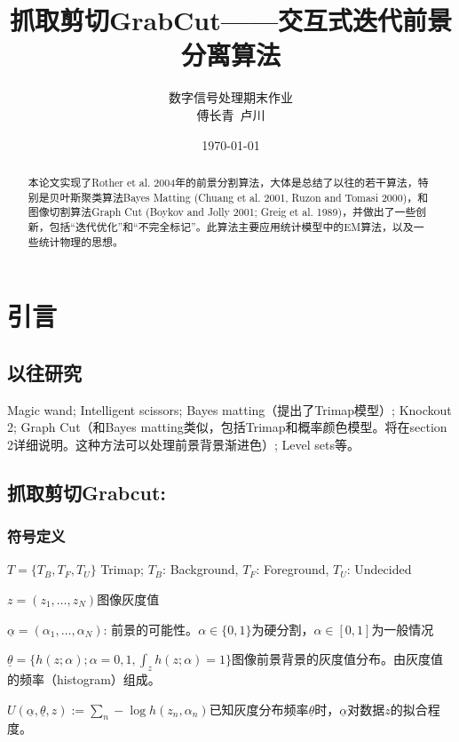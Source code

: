 \documentclass[a4paper, 11pt, nofonts, nocap, fancyhdr, hyperref, UTF8]{ctexart}
\begin{document}
\title{抓取剪切GrabCut——交互式迭代前景分离算法}

\author{\small{数字信号处理期末作业}\\
傅长青\ 卢川\\
}
\date{\today}
\maketitle

\begin{abstract}%
本论文实现了Rother et al. 2004年的前景分割算法\cite{rother2004grabcut}，大体是总结了以往的若干算法，特别是贝叶斯聚类算法Bayes Matting (Chuang et al. 2001, Ruzon and Tomasi 2000)，和图像切割算法Graph Cut (Boykov and Jolly 2001; Greig et al. 1989)，并做出了一些创新，包括“迭代优化”和“不完全标记”。此算法主要应用统计模型中的EM算法，以及一些统计物理的思想。
\end{abstract}

\section{引言}
\subsection{以往研究}
Magic wand; Intelligent scissors; Bayes matting（提出了Trimap模型）; Knockout 2; Graph Cut（和Bayes matting类似，包括Trimap和概率颜色模型。将在section 2详细说明。这种方法可以处理前景背景渐进色）; Level sets等。

\subsection{抓取剪切Grabcut:}
\subsubsection{符号定义}
$T = \{T_B, T_F, T_U\}$ Trimap; $T_B$: Background, $T_F$: Foreground, $T_U$: Undecided 

$z = (z_1,\ldots,z_N)$图像灰度值

$\underline{\alpha} = (\alpha_1,\ldots,\alpha_N)$: 前景的可能性。$\alpha \in \{0,1\}$为硬分割，$\alpha \in [0,1]$为一般情况

$\underline{\theta} = \{h(z; \alpha); \alpha = 0,1, \int_z h(z; \alpha) = 1\}$图像前景背景的灰度值分布。由灰度值的频率（histogram）组成。

$U(\underline{\alpha},\underline{\theta},z) := \sum_n -\log h(z_n, \alpha_n)$已知灰度分布频率$\underline{\theta}$时，$\underline{\alpha}$对数据$z$的拟合程度。
\end{document}
